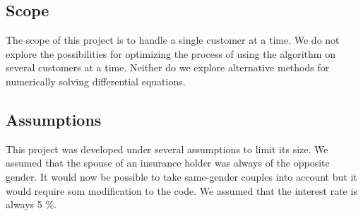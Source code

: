 \subsection{Scope}
	The scope of this project is to handle a single customer at a time. We do not explore the possibilities for optimizing the process of using the algorithm on several customers at a time. Neither do we explore alternative methods for numerically solving differential equations.
	
\subsection{Assumptions}
This project was developed under several assumptions to limit its size. We assumed that the spouse of an insurance holder was always of the opposite gender. It would now be possible to take same-gender couples into account but it would require som modification to the code. We assumed that the  interest rate is always 5 \%. 


